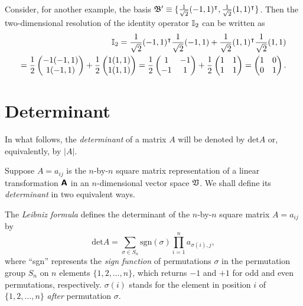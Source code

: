 {Consider, for another example, the basis
${\frak B}' \equiv \{\frac{1}{\sqrt{2}}(-1,1)^\intercal ,\frac{1}{\sqrt{2}}(1,1)^\intercal \}$.
Then the two-dimensional resolution of the identity operator ${\Bbb I}_2$
can be written as
\begin{equation}
\begin{split}
{\Bbb I}_2 =  \frac{1}{\sqrt{2}}   (-1,1)^\intercal   \frac{1}{\sqrt{2}}(-1,1) +   \frac{1}{\sqrt{2}}(1,1)^\intercal  \frac{1}{\sqrt{2}}(1,1)
\\
=
\frac{1}{{2}}
\begin{pmatrix}
-1 (-1,1) \\  1 (-1,1)
\end{pmatrix}
 +
\frac{1}{{2}}
\begin{pmatrix}
1 (1,1)\\
1 (1,1)
\end{pmatrix}
 =
\frac{1}{{2}}
\begin{pmatrix}
1 & -1 \\
-1 & 1
\end{pmatrix}
+
\frac{1}{{2}}
\begin{pmatrix}
1 & 1 \\
1 & 1
\end{pmatrix}
=
\begin{pmatrix}
1 & 0 \\
0 & 1
\end{pmatrix}
.
\end{split}
\end{equation}


}



\section{Determinant}


In what follows, the {\em determinant} of a matrix $A$ will be denoted by $\textrm{det} A$ or,
equivalently, by $\vert A \vert$.

Suppose $A=a_{ij}$ is the  $n$-by-$n$ square matrix representation of
a linear transformation $\textsf{\textbf{A}}$
in an $n$-dimensional vector space ${\frak V}$.
We shall define its {\em determinant}
in two equivalent ways.


The
{\em Leibniz formula}
 defines the determinant of the $n$-by-$n$ square matrix  $A=a_{ij}$ by
\begin{equation}
\textrm{det}A
=\sum_{\sigma \in S_n} \textrm{sgn}(\sigma) \prod_{i=1}^n a_{\sigma(i),j} ,
\end{equation}
where ``sgn'' represents the {\em sign function}
of permutations $\sigma$ in the permutation group $S_n$
on $n$ elements $\{1,2, \ldots , n\}$,
which returns $-1$ and $+1$ for odd and even permutations,
respectively.
$\sigma (i)$ stands for the element in position $i$ of $\{1,2, \ldots , n\}$ {\em after} permutation $\sigma$.

